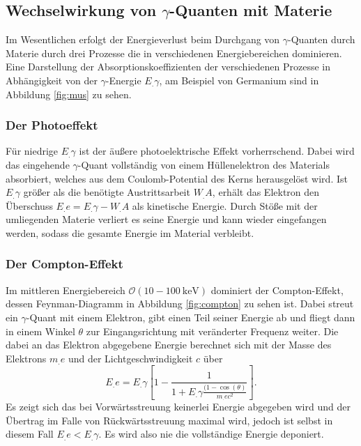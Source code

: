 \subsection{Wechselwirkung von $\gamma$-Quanten mit Materie}
\label{subsec:WW}

Im Wesentlichen erfolgt der Energieverlust beim Durchgang von $\gamma$-Quanten durch Materie durch drei Prozesse die in verschiedenen Energiebereichen dominieren.
Eine Darstellung der Absorptionskoeffizienten der verschiedenen Prozesse in Abhängigkeit von der $\gamma$-Energie $E_.{\gamma}$, am Beispiel von Germanium sind in Abbildung \ref{fig:mus} zu sehen.

\subsubsection{Der Photoeffekt}

Für niedrige $E_.{\gamma}$ ist der äußere photoelektrische Effekt vorherrschend.
Dabei wird das eingehende $\gamma$-Quant vollständig von einem Hüllenelektron des Materials absorbiert, welches aus dem Coulomb-Potential des Kerns herausgelöst wird. Ist $E_.{\gamma}$ größer als die benötigte Austrittsarbeit $W_.A$, erhält das Elektron den Überschuss $E_.e = E_.{\gamma} - W_.A$ als kinetische Energie. Durch Stöße mit der umliegenden Materie verliert es seine Energie und kann wieder eingefangen werden, sodass die gesamte Energie im Material verbleibt.

\subsubsection{Der Compton-Effekt}

Im mittleren Energiebereich $\mathcal{O}(10 - \SI{100}{\kilo\eV})$ dominiert der Compton-Effekt, dessen Feynman-Diagramm in Abbildung \ref{fig:compton} zu sehen ist.
Dabei streut ein $\gamma$-Quant mit einem Elektron, gibt einen Teil seiner Energie ab und fliegt dann in einem Winkel $\theta$ zur Eingangsrichtung mit veränderter Frequenz weiter.
Die dabei an das Elektron abgegebene Energie berechnet sich mit der Masse des Elektrons $m_.e$ und der Lichtgeschwindigkeit $c$ über
\[
E_.e = E_.{\gamma}\left[1-\frac{1}{1+E_.{\gamma}\frac{(1-\cos(\theta)}{m_.ec^2}}\right]\text{.}
\]
Es zeigt sich das bei Vorwärtsstreuung keinerlei Energie abgegeben wird und der Übertrag im Falle von Rückwärtsstreuung maximal wird, jedoch ist selbst in diesem Fall $E_.e < E_.{\gamma}$. Es wird also nie die vollständige Energie deponiert.

